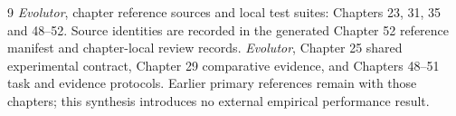\begin{thebibliography}{9}
 \emph{Evolutor}, chapter reference sources and local
test suites: Chapters 23, 31, 35 and 48--52. Source identities are recorded
in the generated Chapter 52 reference manifest and chapter-local review records.
 \emph{Evolutor}, Chapter 25 shared experimental
contract, Chapter 29 comparative evidence, and Chapters 48--51 task and
evidence protocols. Earlier primary references remain with those chapters;
this synthesis introduces no external empirical performance result.
\end{thebibliography}
